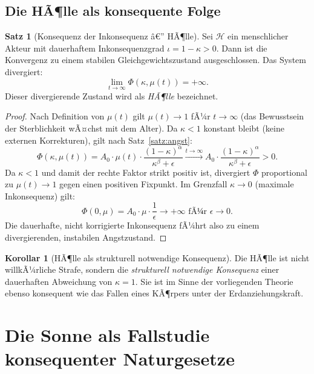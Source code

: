 ﻿\documentclass[a4paper,12pt]{article}
\theoremstyle{definition}
\newtheorem{satz}{Satz}
\newtheorem{korollar}{Korollar}
\begin{document}
\subsection{Die HÃ¶lle als konsequente Folge}

\begin{satz}[Konsequenz der Inkonsequenz â€” HÃ¶lle]
\label{satz:hoelle}
Sei $\mathcal{H}$ ein menschlicher Akteur mit dauerhaftem Inkonsequenzgrad $\iota = 1 - \kappa > 0$. Dann ist die Konvergenz zu einem stabilen Gleichgewichtszustand ausgeschlossen. Das System divergiert:
\[
\lim_{t \to \infty} \Phi(\kappa, \mu(t)) = +\infty.
\]
Dieser divergierende Zustand wird als \emph{HÃ¶lle} bezeichnet.
\end{satz}

\begin{proof}
Nach Definition von $\mu(t)$ gilt $\mu(t) \to 1$ fÃ¼r $t \to \infty$ (das Bewusstsein der Sterblichkeit wÃ¤chst mit dem Alter). Da $\kappa < 1$ konstant bleibt (keine externen Korrekturen), gilt nach Satz~\ref{satz:angst}:
\[
\Phi(\kappa, \mu(t)) = A_0 \cdot \mu(t) \cdot \frac{(1-\kappa)^\alpha}{\kappa^\beta + \epsilon} \xrightarrow{t \to \infty} A_0 \cdot \frac{(1-\kappa)^\alpha}{\kappa^\beta + \epsilon} > 0.
\]
Da $\kappa < 1$ und damit der rechte Faktor strikt positiv ist, divergiert $\Phi$ proportional zu $\mu(t) \to 1$ gegen einen positiven Fixpunkt. Im Grenzfall $\kappa \to 0$ (maximale Inkonsequenz) gilt:
\[
\Phi(0, \mu) = A_0 \cdot \mu \cdot \frac{1}{\epsilon} \to +\infty \text{ fÃ¼r } \epsilon \to 0.
\]
Die dauerhafte, nicht korrigierte Inkonsequenz fÃ¼hrt also zu einem divergierenden, instabilen Angstzustand. \qedhere
\end{proof}

\begin{korollar}[HÃ¶lle als strukturell notwendige Konsequenz]
Die HÃ¶lle ist nicht willkÃ¼rliche Strafe, sondern die \emph{strukturell notwendige Konsequenz} einer dauerhaften Abweichung von $\kappa = 1$. Sie ist im Sinne der vorliegenden Theorie ebenso konsequent wie das Fallen eines KÃ¶rpers unter der Erdanziehungskraft.
\end{korollar}

\section{Die Sonne als Fallstudie konsequenter Naturgesetze}
\end{document}
